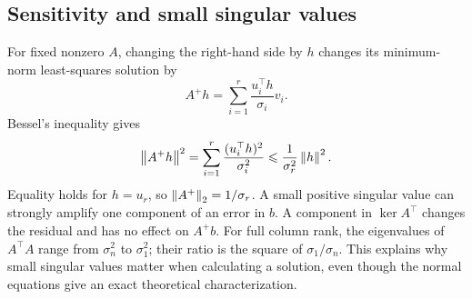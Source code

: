 \subsection*{Sensitivity and small singular values}
For fixed nonzero \(A\), changing the right-hand side by \(h\) changes
its minimum-norm least-squares solution by
\[
A^+h=\sum_{i=1}^r\frac{u_i^\top h}{\sigma_i}v_i.
\]
Bessel's inequality gives
\[
\left\lVert A^+h\right\rVert^2=\sum_{i=1}^r\frac{(u_i^\top h)^2}{\sigma_i^2}
\leqslant\frac1{\sigma_r^2}\left\lVert h\right\rVert^2.
\]
Equality holds for \(h=u_r\), so \(\left\lVert A^+\right\rVert_2=1/\sigma_r\).
A small positive singular value can strongly amplify one component of
an error in \(b\). A component in \(\ker A^\top\) changes the residual
and has no effect on \(A^+b\).
For full column rank, the eigenvalues of \(A^\top A\) range from
\(\sigma_n^2\) to \(\sigma_1^2\); their ratio is the square of
\(\sigma_1/\sigma_n\). This explains why small singular values matter
when calculating a solution, even though the normal equations give an
exact theoretical characterization.

